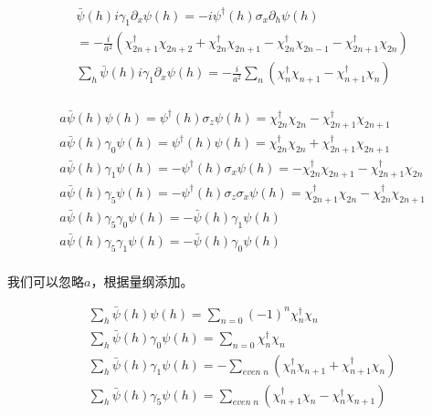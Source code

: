 \begin{equation}
\begin{split}
&\bar{\psi}(h)i\gamma _1\partial _x \psi(h) =-i\psi^{\dagger}(h) \sigma _x \partial _h \psi(h) \\
&=-\frac{i}{a^2}\left(\chi^{\dagger}_{2n+1}\chi_{2n+2}+\chi^{\dagger}_{2n}\chi _{2n+1} - \chi^{\dagger}_{2n}\chi _{2n-1}- \chi ^{\dagger}_{2n+1}\chi _{2n}\right)\\
&\sum _h \bar{\psi}(h)i\gamma _1\partial _x \psi(h) = -\frac{i}{a^2} \sum _n \left(\chi^{\dagger}_n\chi _{n+1} - \chi ^{\dagger}_{n+1}\chi _n\right)\\
\end{split}
\end{equation}

\begin{equation}
\begin{split}
&a\bar{\psi}(h) \psi(h) =\psi^{\dagger}(h) \sigma _z  \psi(h) =\chi ^{\dagger}_{2n}\chi _{2n}-\chi ^{\dagger}_{2n+1}\chi _{2n+1}\\
&a\bar{\psi}(h) \gamma _0 \psi(h) =\psi^{\dagger}(h) \psi(h) = \chi ^{\dagger}_{2n}\chi _{2n}+\chi ^{\dagger}_{2n+1}\chi _{2n+1}\\
&a\bar{\psi}(h) \gamma _1 \psi(h) =-\psi^{\dagger}(h) \sigma _x  \psi(h) = -\chi ^{\dagger}_{2n}\chi _{2n+1}-\chi ^{\dagger}_{2n+1}\chi _{2n}\\
&a\bar{\psi}(h) \gamma _5 \psi(h) =-\psi^{\dagger}(h) \sigma _z\sigma _x  \psi(h) = \chi ^{\dagger}_{2n+1}\chi _{2n} - \chi ^{\dagger}_{2n}\chi _{2n+1}\\
&a\bar{\psi}(h) \gamma _5\gamma _0 \psi(h) =- \bar{\psi}(h) \gamma _1 \psi(h) \\
&a\bar{\psi}(h) \gamma _5\gamma _1 \psi(h) =-\bar{\psi}(h) \gamma _0 \psi(h)\\
\end{split}
\end{equation}

我们可以忽略$a$，根据量纲添加。

\begin{equation}
\begin{split}
&\sum _h \bar{\psi}(h) \psi(h) = \sum _{n=0} (-1)^n \chi^{\dagger} _n\chi _n\\
&\sum _h \bar{\psi}(h) \gamma _0 \psi(h) =\sum _{n=0} \chi^{\dagger} _n\chi _n\\
&\sum _h \bar{\psi}(h) \gamma _1 \psi(h) =-\sum _{even\;n} \left(\chi ^{\dagger}_{n}\chi _{n+1}+\chi ^{\dagger}_{n+1}\chi _{n}\right)\\
&\sum _h \bar{\psi}(h) \gamma _5 \psi(h) =\sum _{even\;n} \left(\chi ^{\dagger}_{n+1}\chi _{n} - \chi ^{\dagger}_{n}\chi _{n+1}\right)\\
\end{split}
\end{equation}

